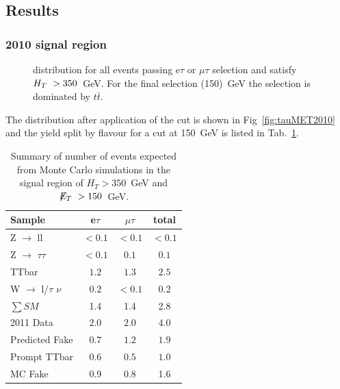 \subsection{Results}\label{sec:tauResults}

\subsubsection{2010 signal region}
\begin{figure}[hbtp]
  \hfill
  \caption{\MET distribution for all events passing e$\tau$ or $\mu\tau$ selection and satisfy $H_T~> 350$~GeV. For the final \MET selection (150)~GeV the selection is dominated by $t\bar{t}$.}
\end{figure}

The \MET distribution after application of the \HT
cut is shown in Fig~\ref{fig:tauMET2010} and
the yield split by flavour for a cut at 150~GeV is listed in Tab.~\ref{tab:tau2010}.

\begin{table}[htb]
\begin{center}
\caption{\label{tab:tau2010}\protect Summary of number of events expected from Monte Carlo simulations in 
the signal region of $H_T> 350$~GeV and $\displaystyle{\not} E_T~> 150$~GeV.}

\begin{tabular}{l|c c |c}
Sample & e$\tau$ & $\mu\tau$ & total\\
\hline
Z $\rightarrow$ ll & $< 0.1$ & $< 0.1$ & $< 0.1$\\
Z $\rightarrow$ $\tau$$\tau$ & $< 0.1$ & $0.1$ & $0.1$\\
TTbar & $1.2$ & $1.3$ & $2.5$\\
W $\rightarrow$ l/$\tau$ $\nu$ & $0.2$ & $< 0.1$ & $0.2$\\
$\sum SM$ & 1.4 & 1.4 & 2.8\\
\hline
2011 Data & $2.0$ & $2.0$ & $4.0$\\
\hline
\hline
Predicted Fake & $0.7$ & $1.2$ & $1.9$\\
Prompt TTbar   & $0.6$ & $0.5$ & $1.0$\\
\hline
MC Fake & 0.9 & 0.8 & 1.6 \\
\end{tabular}
\end{center}
\end{table}

